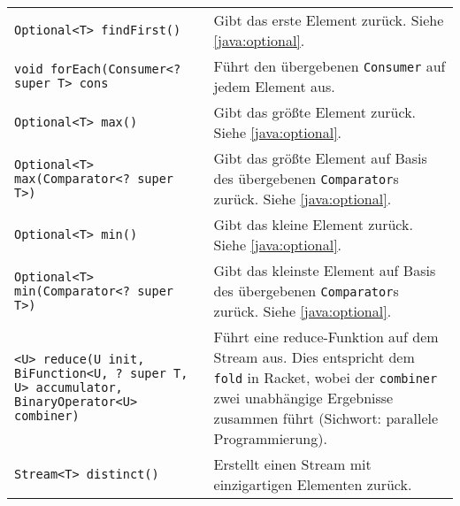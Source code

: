 \begin{sidewaystable}
\begin{tabular}{p{8cm} | p{13cm}}
					\texttt{Optional<T> findFirst()}                                                                 & Gibt das erste Element zurück. Siehe \ref{java:optional}.                                                                                                                                                     \\
					\texttt{void forEach(Consumer<? super T> cons}                                                   & Führt den übergebenen \texttt{Consumer} auf jedem Element aus.                                                                                                                                                \\
					\texttt{Optional<T> max()}                                                                       & Gibt das größte Element zurück. Siehe \ref{java:optional}.                                                                                                                                                    \\
					\texttt{Optional<T> max(Comparator<? super T>)}                                                  & Gibt das größte Element auf Basis des übergebenen \texttt{Comparator}s zurück. Siehe \ref{java:optional}.                                                                                                     \\
					\texttt{Optional<T> min()}                                                                       & Gibt das kleine Element zurück. Siehe \ref{java:optional}.                                                                                                                                                    \\
					\texttt{Optional<T> min(Comparator<? super T>)}                                                  & Gibt das kleinste Element auf Basis des übergebenen \texttt{Comparator}s zurück. Siehe \ref{java:optional}.                                                                                                   \\
					\texttt{<U> reduce(U init, BiFunction<U, ? super T, U> accumulator, BinaryOperator<U> combiner)} & Führt eine reduce-Funktion auf dem Stream aus. Dies entspricht dem \texttt{fold} in Racket, wobei der \texttt{combiner} zwei unabhängige Ergebnisse zusammen führt (Sichwort: parallele Programmierung).      \\
					\hline
					\texttt{Stream<T> distinct()}                                                                    & Erstellt einen Stream mit einzigartigen Elementen zurück.                                                                                                                                                     \\

\end{tabular}
\end{sidewaystable}

